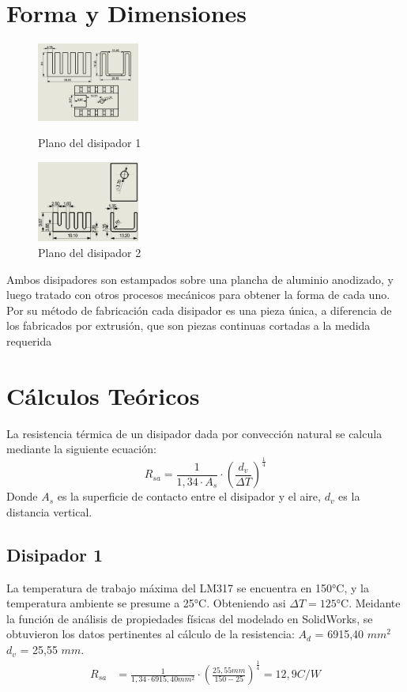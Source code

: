 \documentclass[conference]{IEEEtran}
\begin{document}
\section{Forma y Dimensiones}
\begin{figure}[h]
    \centering
    \includegraphics[width=0.3\textwidth]{PlanoRamiCompleto.png}
    \caption{Plano del disipador 1}
    \centering
    \includegraphics[width=0.3\textwidth]{disipadorFacu.png}
    \caption{Plano del disipador 2}
\end{figure}
Ambos disipadores son estampados sobre una plancha de aluminio anodizado, y luego tratado con otros 
procesos mecánicos para obtener la forma de cada uno. Por su método de fabricación cada disipador
es una pieza única, a diferencia de los fabricados por extrusión, que son piezas continuas cortadas 
a la medida requerida

\section{Cálculos Teóricos}
La resistencia térmica de un disipador dada por convección natural se calcula mediante la siguiente
ecuación:
\begin{equation}
    R_{sa} = \frac{1}{1,34\cdot A_s}\cdot (\frac{d_v}{\Delta T})^{\frac{1}{4}}
\end{equation}
Donde $A_s$ es la superficie de contacto entre el disipador y el aire, $d_v$ es la distancia vertical.

\subsection{Disipador 1}
La temperatura de trabajo máxima del LM317 se encuentra en 150°C, y la temperatura ambiente
se presume a 25°C. Obteniendo asi $\Delta T = 125$°C.
Meidante la función de análisis de propiedades físicas del modelado en SolidWorks, se obtuvieron
los datos pertinentes al cálculo de la resistencia:
$A_d$ = 6915,40 $mm^2$
$d_v$ = 25,55 $mm$.
\begin{align*}
    R_{sa} &= \frac{1}{1,34\cdot 6915,40mm^2}\cdot \left(\frac{25,55mm}{150-25}\right)^{\frac{1}{4}} = 12,9 C/W
\end{align*}
\end{document}
